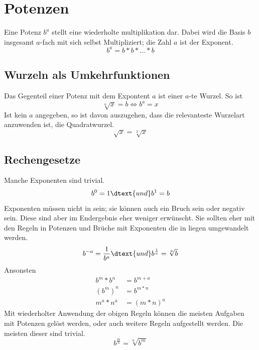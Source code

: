 \documentclass{article}
\begin{document}
\section{Potenzen} 
Eine Potenz $b^a$ stellt eine wiederholte multiplikation dar. Dabei wird die Basis $b$ insgesamt $a$-fach mit sich selbst Multipliziert; die Zahl $a$ ist der Exponent.
\[
 b^a = b*b* \dots{} *b
\]

\subsection{Wurzeln als Umkehrfunktionen}
Das Gegenteil einer Potenz mit dem Expontent $a$ ist einer $a$-te Wurzel. So ist
\[
 \sqrt[a]{x} = b
 \Leftrightarrow
 b^a=x
\]
Ist kein $a$ angegeben, so ist davon auszugehen, dass die relevanteste Wurzelart anzuwenden ist, die Quadratwurzel.
\[
 \sqrt{x} = \sqrt[2]{x}
\]

\subsection{Rechengesetze}
Manche Exponenten sind trivial.
\[
 b^0 = 1 \dtext{und} b^1=b
\]
Exponenten müssen nicht in \tN sein; sie können auch ein Bruch sein oder negativ sein. Diese sind aber im Endergebnis eher weniger erwünscht. Sie sollten eher mit den Regeln in Potenzen und Brüche mit Exponenten die in \tN liegen umgewandelt werden. 
\[
 b^{-a} = \frac{1}{b^a}
 \dtext{und}
 b^\frac{1}{a} = \sqrt[a]{b}
\]
Ansonsten
\begin{align*}
 b^m * b^n &= b^{m+a} \\
 (b^m)^n &= b^{m*n} \\
 m^a * n^a &= (m*n)^a
\end{align*}
Mit wiederholter Anwendung der obigen Regeln können die meisten Aufgaben mit Potenzen gelöst werden, oder auch weitere Regeln aufgestellt werden. Die meisten dieser sind trivial.
\[
 b^\frac{m}{n} = \sqrt[n]{b^m}
\]
\end{document}
